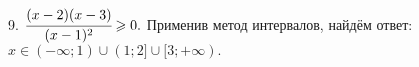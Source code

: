 9. $\cfrac{(x-2)(x-3)}{(x-1)^2}\geqslant0.$ Применив метод интервалов, найдём ответ: $x\in(-\infty;1)\cup(1;2]\cup[3;+\infty).$
\begin{figure}[ht!]
\end{figure}\\
